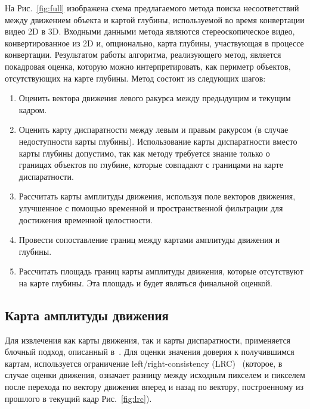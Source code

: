 \documentclass[14pt, a4paper]{extarticle}
\begin{document}
На Рис.~\ref{fig:full} изображена схема предлагаемого метода поиска несоответствий между
движением объекта и картой глубины, используемой во время конвертации видео 2D в 3D.
Входными данными метода являются стереоскопическое видео, конвертированное из 2D и,
опционально, карта глубины, участвующая в процессе конвертации. Результатом работы
алгоритма, реализующего метод, является покадровая оценка, которую можно интерпретировать, 
как периметр объектов, отсутствующих на карте глубины. Метод состоит из следующих шагов:

\begin{enumerate}
	\item Оценить вектора движения левого ракурса между предыдущим и текущим кадром.
	\item Оценить карту диспаратности между левым и правым ракурсом (в случае недоступности карты глубины).
	Использование карты диспаратности вместо карты глубины допустимо, так как методу требуется
	знание только о границах объектов по глубине, которые совпадают с границами на карте диспаратности.
	\item Рассчитать карты амплитуды движения, используя поле векторов движения, улучшенное
	с помощью временной и пространственной фильтрации для достижения временной целостности.
	\item Провести сопоставление границ между картами амплитуды движения и глубины.
	\item Рассчитать площадь границ карты амплитуды движения, которые отсутствуют на карте глубины.
	Эта площадь и будет являться финальной оценкой.
\end{enumerate}

\subsection{Карта амплитуды движения}



Для извлечения как карты движения, так и карты диспаратности, применяется блочный подход,
описанный в~\cite{simonyan2008fast}. Для оценки значения доверия к получившимся картам, используется
ограничение left\slash right-consistency (LRC)~\cite{egnal2004stereo} (которое, в случае оценки движения,
означает разницу между исходным пикселем и пикселем после перехода по вектору движения 
вперед и назад по вектору, построенному из прошлого в текущий кадр Рис.~\ref{fig:lrc}).



\end{document}

